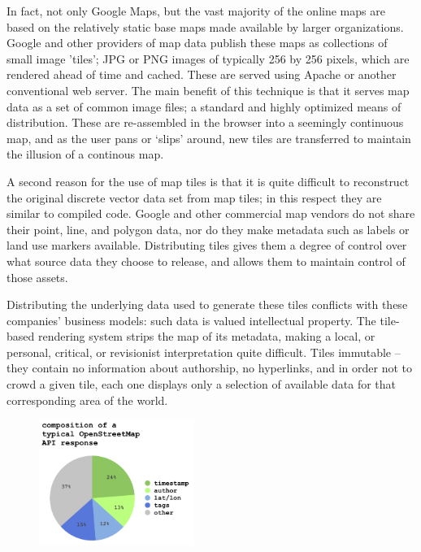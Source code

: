 \documentclass[11pt]{report}
\begin{document}
In fact, not only Google Maps, but the vast majority of the online maps are based on the relatively static base maps made available by larger organizations. Google and other providers of map data publish these maps as collections of small image 'tiles'; JPG or PNG images of typically 256 by 256 pixels, which are rendered ahead of time and cached. These are served using Apache or another conventional web server. The main benefit of this technique is that it serves map data as a set of common image files; a standard and highly optimized means of distribution. These are re-assembled in the browser into a seemingly continuous map, and as the user pans or `slips' around, new tiles are transferred to maintain the illusion of a continous map.

A second reason for the use of map tiles is that it is quite difficult to reconstruct the original discrete vector data set from map tiles; in this respect they are similar to compiled code. Google and other commercial map vendors do not share their point, line, and polygon data, nor do they make metadata such as labels or land use markers available. Distributing tiles gives them a degree of control over what source data they choose to release, and allows them to maintain control of those assets.

Distributing the underlying data used to generate these tiles conflicts with these companies' business models: such data is valued intellectual property. The tile-based rendering system strips the map of its metadata, making a local, or personal, critical, or revisionist interpretation quite difficult. Tiles immutable – they contain no information about authorship, no hyperlinks, and in order not to crowd a given tile, each one displays only a selection of available data for that corresponding area of the world. 

\begin{figure}
	\begin{flushleft}
		\includegraphics[width=0.45\textwidth]{images/osm-composition.png}
	\end{flushleft}
\end{figure}
\end{document}
